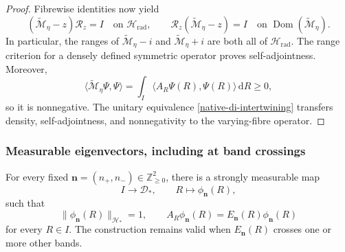 \begin{proof}
Fibrewise identities now yield
\[
 (\widetilde{\mathscr M}_\eta-z)\mathcal R_z=I
 \quad\text{on }\mathscr H_{\mathrm{rad}},
 \qquad
 \mathcal R_z(\widetilde{\mathscr M}_\eta-z)=I
 \quad\text{on }\operatorname{Dom}(\widetilde{\mathscr M}_\eta).
\]
In particular, the ranges of
\(\widetilde{\mathscr M}_\eta-i\) and
\(\widetilde{\mathscr M}_\eta+i\) are both all of
\(\mathscr H_{\mathrm{rad}}\).  The range criterion for a densely defined
symmetric operator proves self-adjointness.  Moreover,
\[
 \langle\widetilde{\mathscr M}_\eta\Psi,\Psi\rangle
 =\int_I\langle A_R\Psi(R),\Psi(R)\rangle\,\mathrm d R\ge0,
\]
so it is nonnegative.  The unitary equivalence
\eqref{native-di-intertwining} transfers density, self-adjointness, and
nonnegativity to the varying-fibre operator.
\end{proof}

\subsubsection{Measurable eigenvectors, including at band crossings}

\begin{lemma}
\label{native-di-measurable-eigenvector-lemma}
For every fixed
\(\mathbf n=(n_+,n_-)\in\mathbb Z_{\ge0}^2\), there is a strongly
measurable map
\[
 I\longrightarrow\mathscr D_*,
 \qquad R\longmapsto\phi_{\mathbf n}(R),
\]
such that
\begin{equation}
 \|\phi_{\mathbf n}(R)\|_{\mathscr H_*}=1,
 \qquad
 A_R\phi_{\mathbf n}(R)
 =E_{\mathbf n}(R)\phi_{\mathbf n}(R)
\label{native-di-measurable-eigenvector}
\end{equation}
for every \(R\in I\).  The construction remains valid when
\(E_{\mathbf n}(R)\) crosses one or more other bands.
\end{lemma}

